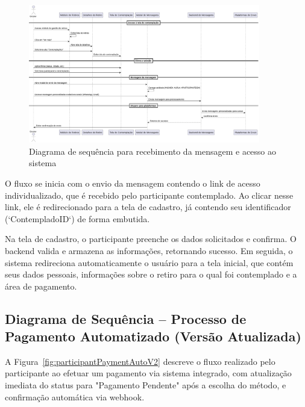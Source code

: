 \begin{figure}[H]
    \centering
    \includegraphics[width=0.9\textwidth]{images/diagramasdesequencias/manualContemplationMessage.png}
    \caption{Diagrama de sequência para recebimento da mensagem e acesso ao sistema}
    \label{fig:participantAccess}
\end{figure}

O fluxo se inicia com o envio da mensagem contendo o link de acesso individualizado, que é recebido pelo participante contemplado. Ao clicar nesse link, ele é redirecionado para a tela de cadastro, já contendo seu identificador (`ContempladoID`) de forma embutida.

Na tela de cadastro, o participante preenche os dados solicitados e confirma. O backend valida e armazena as informações, retornando sucesso. Em seguida, o sistema redireciona automaticamente o usuário para a tela inicial, que contém seus dados pessoais, informações sobre o retiro para o qual foi contemplado e a área de pagamento.

\subsection{Diagrama de Sequência – Processo de Pagamento Automatizado (Versão Atualizada)}

A Figura~\ref{fig:participantPaymentAutoV2} descreve o fluxo realizado pelo participante ao efetuar um pagamento via sistema integrado, com atualização imediata do status para "Pagamento Pendente" após a escolha do método, e confirmação automática via webhook.

